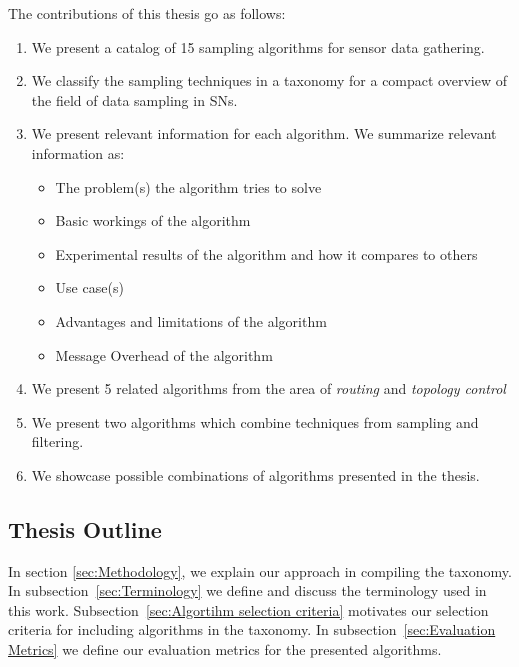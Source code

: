The contributions of this thesis go as follows: 
\begin{enumerate}
    \item We present a catalog of 15 sampling algorithms for sensor data
    gathering.
    \item We classify the sampling techniques in a taxonomy for a compact
    overview of the field of data sampling in \acp{SN}.
    \item We present relevant information for each algorithm. We summarize
    relevant information as:

        \begin{itemize}
            \item The problem(s) the algorithm tries to solve
            \item Basic workings of the algorithm
            \item Experimental results of the algorithm and how it compares to
            others
            \item Use case(s)
            \item Advantages and limitations of the algorithm
            \item Message Overhead of the algorithm
        \end{itemize}

    \item We present 5 related algorithms from the area of \textit{routing}
    and \textit{topology control}

    \item We present two algorithms which combine techniques from sampling and
    filtering.

    \item We showcase possible combinations of algorithms presented in the
    thesis.

\end{enumerate}

\subsection{Thesis Outline}

  In section \ref{sec:Methodology}, we
explain our approach in compiling the taxonomy. In
subsection~\ref{sec:Terminology} we define and discuss the terminology used in
this work. Subsection~\ref{sec:Algortihm selection criteria} motivates our
selection criteria for including algorithms in the taxonomy. In
subsection~\ref{sec:Evaluation Metrics} we define our evaluation metrics for
the presented algorithms.

